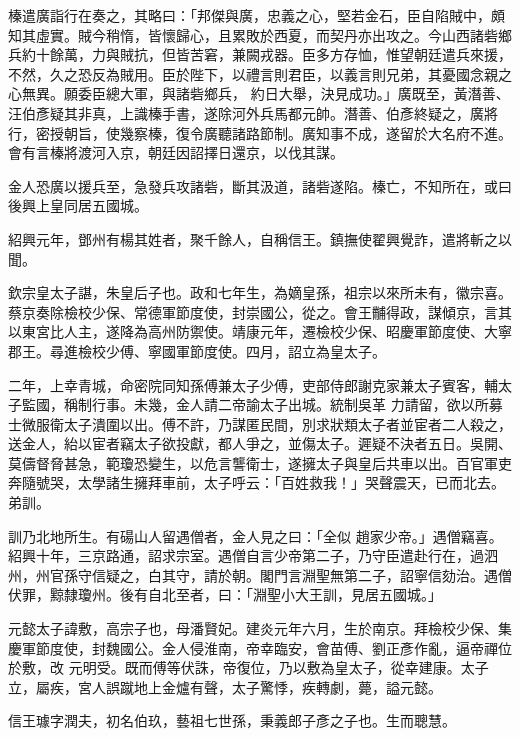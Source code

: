 \begin{pinyinscope}
 榛遣廣詣行在奏之，其略曰：「邦傑與廣，忠義之心，堅若金石，臣自陷賊中，頗知其虛實。賊今稍惰，皆懷歸心，且累敗於西夏，而契丹亦出攻之。今山西諸砦鄉兵約十餘萬，力與賊抗，但皆苦窘，兼闕戎器。臣多方存恤，惟望朝廷遣兵來援，不然，久之恐反為賊用。臣於陛下，以禮言則君臣，以義言則兄弟，其憂國念親之心無異。願委臣總大軍，與諸砦鄉兵，
 約日大舉，決見成功。」廣既至，黃潛善、汪伯彥疑其非真，上識榛手書，遂除河外兵馬都元帥。潛善、伯彥終疑之，廣將行，密授朝旨，使幾察榛，復令廣聽諸路節制。廣知事不成，遂留於大名府不進。會有言榛將渡河入京，朝廷因詔擇日還京，以伐其謀。



 金人恐廣以援兵至，急發兵攻諸砦，斷其汲道，諸砦遂陷。榛亡，不知所在，或曰後興上皇同居五國城。



 紹興元年，鄧州有楊其姓者，聚千餘人，自稱信王。鎮撫使翟興覺詐，遣將斬之以聞。



 欽宗皇太子諶，朱皇后子也。政和七年生，為嫡皇孫，祖宗以來所未有，徽宗喜。蔡京奏除檢校少保、常德軍節度使，封崇國公，從之。會王黼得政，謀傾京，言其以東宮比人主，遂降為高州防禦使。靖康元年，遷檢校少保、昭慶軍節度使、大寧郡王。尋進檢校少傅、寧國軍節度使。四月，詔立為皇太子。



 二年，上幸青城，命密院同知孫傅兼太子少傅，吏部侍郎謝克家兼太子賓客，輔太子監國，稱制行事。未幾，金人請二帝諭太子出城。統制吳革
 力請留，欲以所募士微服衛太子潰圍以出。傅不許，乃謀匿民間，別求狀類太子者並宦者二人殺之，送金人，紿以宦者竊太子欲投獻，都人爭之，並傷太子。遲疑不決者五日。吳開、莫儔督脅甚急，範瓊恐變生，以危言讋衛士，遂擁太子與皇后共車以出。百官軍吏奔隨號哭，太學諸生擁拜車前，太子呼云：「百姓救我！」哭聲震天，已而北去。弟訓。



 訓乃北地所生。有碭山人留遇僧者，金人見之曰：「全似
 趙家少帝。」遇僧竊喜。紹興十年，三京路通，詔求宗室。遇僧自言少帝第二子，乃守臣遣赴行在，過泗州，州官孫守信疑之，白其守，請於朝。閣門言淵聖無第二子，詔寧信劾治。遇僧伏罪，黥隸瓊州。後有自北至者，曰：「淵聖小大王訓，見居五國城。」



 元懿太子諱敷，高宗子也，母潘賢妃。建炎元年六月，生於南京。拜檢校少保、集慶軍節度使，封魏國公。金人侵淮南，帝幸臨安，會苗傅、劉正彥作亂，逼帝禪位於敷，改
 元明受。既而傅等伏誅，帝復位，乃以敷為皇太子，從幸建康。太子立，屬疾，宮人誤蹴地上金爐有聲，太子驚悸，疾轉劇，薨，謚元懿。



 信王璩字潤夫，初名伯玖，藝祖七世孫，秉義郎子彥之子也。生而聰慧。




\end{pinyinscope}
